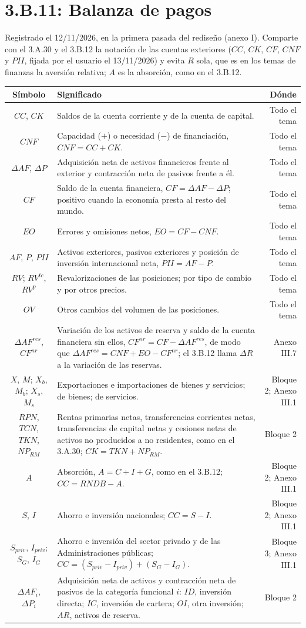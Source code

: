 \documentclass[10pt,a4paper]{article}
\newcommand{\cabecera}{\toprule\textbf{Símbolo} & \textbf{Significado} & \textbf{Dónde}\\\midrule\endhead\bottomrule\endfoot}
\begin{document}
\section{3.B.11: Balanza de pagos}
Registrado el 12/11/2026, en la primera pasada del rediseño (anexo I). Comparte con el 3.A.30 y el 3.B.12 la notación de las cuentas exteriores ($CC$, $CK$, $CF$, $CNF$ y $PII$, fijada por el usuario el 13/11/2026) y evita $R$ sola, que es en los temas de finanzas la aversión relativa; $A$ es la absorción, como en el 3.B.12.
\begin{longtable}{SMD}
\cabecera
$CC$, $CK$ & Saldos de la cuenta corriente y de la cuenta de capital. & Todo el tema\\
$CNF$ & Capacidad ($+$) o necesidad ($-$) de financiación, $CNF=CC+CK$. & Todo el tema\\
$\Delta AF$, $\Delta P$ & Adquisición neta de activos financieros frente al exterior y contracción neta de pasivos frente a él. & Todo el tema\\
$CF$ & Saldo de la cuenta financiera, $CF=\Delta AF-\Delta P$; positivo cuando la economía presta al resto del mundo. & Todo el tema\\
$EO$ & Errores y omisiones netos, $EO=CF-CNF$. & Todo el tema\\
$AF$, $P$, $PII$ & Activos exteriores, pasivos exteriores y posición de inversión internacional neta, $PII=AF-P$. & Todo el tema\\
$RV$; $RV^{tc}$, $RV^{p}$ & Revalorizaciones de las posiciones; por tipo de cambio y por otros precios. & Todo el tema\\
$OV$ & Otros cambios del volumen de las posiciones. & Todo el tema\\
$\Delta AF^{res}$, $CF^{nr}$ & Variación de los activos de reserva y saldo de la cuenta financiera sin ellos, $CF^{nr}=CF-\Delta AF^{res}$, de modo que $\Delta AF^{res}=CNF+EO-CF^{nr}$; el 3.B.12 llama $\Delta R$ a la variación de las reservas. & Anexo III.7\\
$X$, $M$; $X_b$, $M_b$; $X_s$, $M_s$ & Exportaciones e importaciones de bienes y servicios; de bienes; de servicios. & Bloque 2; Anexo III.1\\
$RPN$, $TCN$, $TKN$, $NP_{RM}$ & Rentas primarias netas, transferencias corrientes netas, transferencias de capital netas y cesiones netas de activos no producidos a no residentes, como en el 3.A.30; $CK=TKN+NP_{RM}$. & Bloque 2\\
$A$ & Absorción, $A=C+I+G$, como en el 3.B.12; $CC=RNDB-A$. & Bloque 2; Anexo III.1\\
$S$, $I$ & Ahorro e inversión nacionales; $CC=S-I$. & Bloque 2; Anexo III.1\\
$S_{priv}$, $I_{priv}$; $S_G$, $I_G$ & Ahorro e inversión del sector privado y de las Administraciones públicas; $CC=(S_{priv}-I_{priv})+(S_G-I_G)$. & Bloque 3; Anexo III.1\\
$\Delta AF_i$, $\Delta P_i$ & Adquisición neta de activos y contracción neta de pasivos de la categoría funcional $i$: $ID$, inversión directa; $IC$, inversión de cartera; $OI$, otra inversión; $AR$, activos de reserva. & Bloque 2\\
\end{longtable}
\end{document}
